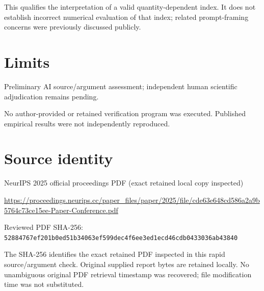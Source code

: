 \documentclass[11pt]{article}
\begin{document}
This qualifies the interpretation of a valid quantity-dependent index. It does not establish incorrect numerical evaluation of that index; related prompt-framing concerns were previously discussed publicly.

\section*{Limits}

Preliminary AI source/argument assessment; independent human scientific adjudication remains pending.\par

No author-provided or retained verification program was executed. Published empirical results were not independently reproduced.\par

\section*{Source identity}

NeurIPS 2025 official proceedings PDF (exact retained local copy inspected)

\url{https://proceedings.neurips.cc/paper_files/paper/2025/file/cde63e648cd586a2a9b5764c73ce15ee-Paper-Conference.pdf}

Reviewed PDF SHA-256: \nolinkurl{52884767ef201b0ed51b34063ef599dec4f6ee3ed1ecd46cdb0433036ab43840}

The SHA-256 identifies the exact retained PDF inspected in this rapid source/argument check. Original supplied report bytes are retained locally. No unambiguous original PDF retrieval timestamp was recovered; file modification time was not substituted.
\end{document}
